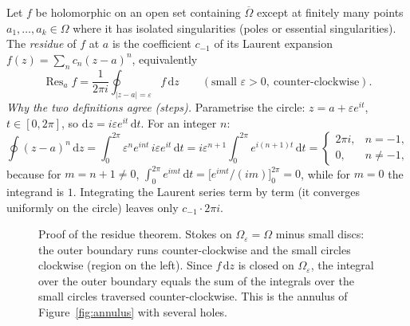 \documentclass[11pt,a4paper]{article}
\numberwithin{equation}{section}
\theoremstyle{definition}
\theoremstyle{plain}
\newcommand{\dd}{\mathrm{d}}
\newcommand{\Res}{\operatorname{Res}}
\begin{document}
Let $f$ be holomorphic on an open set containing $\overline\Omega$ except at finitely many points $a_1,\dots,a_k\in\Omega$ where it has isolated singularities (poles or essential singularities). The \emph{residue} of $f$ at $a$ is the coefficient $c_{-1}$ of its Laurent expansion $f(z)=\sum_nc_n(z-a)^n$, equivalently
\begin{equation}\label{eq:residue}
\Res_af=\frac1{2\pi i}\oint_{|z-a|=\varepsilon}f\,\dd z\qquad(\text{small }\varepsilon>0,\ \text{counter-clockwise}).
\end{equation}
\emph{Why the two definitions agree (steps).} Parametrise the circle: $z=a+\varepsilon e^{it}$, $t\in[0,2\pi]$, so $\dd z=i\varepsilon e^{it}\,\dd t$. For an integer $n$:
\[
\oint(z-a)^n\,\dd z=\int_0^{2\pi}\varepsilon^ne^{int}\,i\varepsilon e^{it}\,\dd t=i\varepsilon^{n+1}\int_0^{2\pi}e^{i(n+1)t}\,\dd t=\begin{cases}2\pi i,&n=-1,\\0,&n\neq-1,\end{cases}
\]
because for $m=n+1\neq0$, $\int_0^{2\pi}e^{imt}\,\dd t=\bigl[e^{imt}/(im)\bigr]_0^{2\pi}=0$, while for $m=0$ the integrand is $1$. Integrating the Laurent series term by term (it converges uniformly on the circle) leaves only $c_{-1}\cdot2\pi i$.

\begin{figure}[ht]
\centering
{}
\caption{Proof of the residue theorem. Stokes on $\Omega_\varepsilon=\Omega$ minus small discs: the outer boundary runs counter-clockwise and the small circles clockwise (region on the left). Since $f\,\dd z$ is closed on $\Omega_\varepsilon$, the integral over the outer boundary equals the sum of the integrals over the small circles traversed counter-clockwise. This is the annulus of Figure~\ref{fig:annulus} with several holes.}
\label{fig:residue}
\end{figure}
\end{document}
